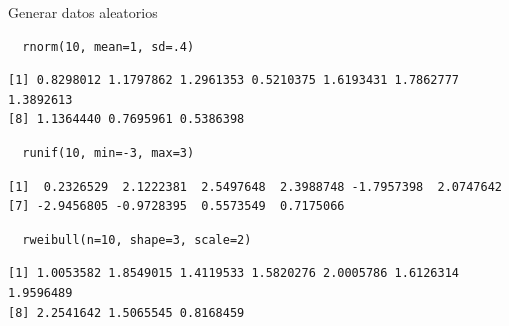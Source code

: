 \documentclass[xcolor={usenames,svgnames,dvipsnames}]{beamer}
\begin{document}
\begin{frame}[fragile,label=sec-2-3]{Generar datos aleatorios}
 \lstset{language=R,label= ,caption= ,numbers=none}
\begin{lstlisting}
  rnorm(10, mean=1, sd=.4)
\end{lstlisting}

\begin{verbatim}
[1] 0.8298012 1.1797862 1.2961353 0.5210375 1.6193431 1.7862777 1.3892613
[8] 1.1364440 0.7695961 0.5386398
\end{verbatim}

\lstset{language=R,label= ,caption= ,numbers=none}
\begin{lstlisting}
  runif(10, min=-3, max=3)
\end{lstlisting}

\begin{verbatim}
[1]  0.2326529  2.1222381  2.5497648  2.3988748 -1.7957398  2.0747642
[7] -2.9456805 -0.9728395  0.5573549  0.7175066
\end{verbatim}

\lstset{language=R,label= ,caption= ,numbers=none}
\begin{lstlisting}
  rweibull(n=10, shape=3, scale=2)
\end{lstlisting}

\begin{verbatim}
[1] 1.0053582 1.8549015 1.4119533 1.5820276 2.0005786 1.6126314 1.9596489
[8] 2.2541642 1.5065545 0.8168459
\end{verbatim}
\end{frame}
\end{document}
